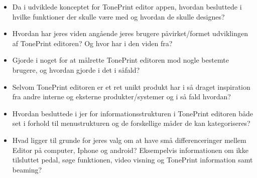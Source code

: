\begin{itemize}
  \item Da i udviklede konceptet for TonePrint editor appen, hvordan besluttede i hvilke funktioner der skulle være med og hvordan de skulle designes? 
  \item Hvordan har jeres viden angående jeres brugere påvirket/formet udviklingen af TonePrint editoren? Og hvor har i den viden fra?
  \item Gjorde i noget for at målrette TonePrint editoren mod nogle bestemte brugere, og hvordan gjorde i det i såfald? 
  \item Selvom TonePrint editoren er et ret unikt produkt har i så draget inspiration fra andre interne og eksterne produkter/systemer og i så fald hvordan?
\end{itemize}

\begin{itemize}
  \item Hvordan besluttede i jer for informationsstrukturen i TonePrint editoren både set i forhold til menustrukturen og de forskellige måder de kan kategoriseres? 
  \item Hvad ligger til grunde for jeres valg om at have små differenceringer mellem Editor på computer, Iphone og android? Eksempelvis informationen om ikke tilsluttet pedal, søge funktionen, video visning og TonePrint information samt beaming?
\end{itemize}

